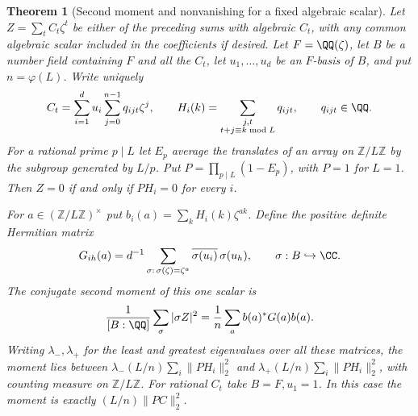 \documentclass[a4paper,11pt]{article}
\newtheorem{theorem}[proposition]{Theorem}
\theoremstyle{definition}
\theoremstyle{remark}
\newcommand{\ZZ}{\mathbb Z}\newcommand{\ord}{\operatorname{ord}}
\numberwithin{equation}{section}
\begin{document}
\begin{theorem}[Second moment and nonvanishing for a fixed algebraic scalar]\leavevmode
\label{thm:scalarorbits332}
Let \(Z=\sum_t C_t\zeta^t\) be either of the preceding sums with
algebraic \(C_t\), with any common algebraic scalar included in the
coefficients if desired. Let \(F=\QQ(\zeta)\), let \(B\) be a number
field containing \(F\) and all the \(C_t\), let \(u_1,\ldots,u_d\)
be an \(F\)-basis of \(B\), and put \(n=\varphi(L)\). Write uniquely
\[
    C_t=\sum_{i=1}^d u_i\sum_{j=0}^{n-1}q_{ijt}\zeta^j,\qquad
    H_i(k)=\sum_{\substack{j,t\\t+j\equiv k\bmod L}} q_{ijt},
               \qquad q_{ijt}\in\QQ .
\]
For a rational prime \(p\mid L\) let \(E_p\) average the translates
of an array on \(\ZZ/L\ZZ\) by the subgroup generated by \(L/p\).
Put \(P=\prod_{p\mid L}(1-E_p)\), with \(P=1\) for \(L=1\).
Then \(Z=0\) if and only if \(P H_i=0\) for every \(i\).

For \(a\in(\ZZ/L\ZZ)^\times\) put \(b_i(a)=\sum_k H_i(k)\zeta^{ak}\).
Define the positive definite Hermitian matrix
\[
   G_{ih}(a)=d^{-1}\sum_{\sigma:\,\sigma(\zeta)=\zeta^a}
                         \overline{\sigma(u_i)}\,\sigma(u_h),
       \qquad \sigma:B\hookrightarrow\CC .
\]
The conjugate second moment of this one scalar is
\begin{equation}\label{eq:fixedmoment332}
  \frac{1}{[B:\QQ]}\sum_\sigma |\sigma Z|^2
        =\frac1n\sum_a b(a)^*G(a)b(a).
\end{equation}
Writing \(\lambda_-,\lambda_+\) for the least and greatest
eigenvalues over all these matrices, the moment lies between
\(\lambda_- (L/n)\sum_i\|PH_i\|_2^2\) and
\(\lambda_+ (L/n)\sum_i\|PH_i\|_2^2\), with counting measure on
\(\ZZ/L\ZZ\). For rational \(C_t\) take \(B=F,u_1=1\).
In this case the moment is exactly \((L/n)\|PC\|_2^2\).
\end{theorem}
\end{document}
